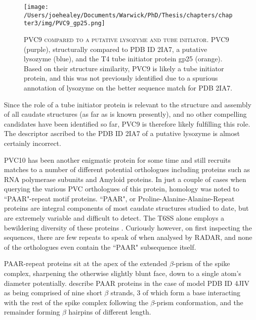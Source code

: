 \begin{figure}[h]
\thispagestyle{IHA-fancy-style}
\centering
\texttt{[image: /Users/joehealey/Documents/Warwick/PhD/Thesis/chapters/chapter3/img/PVC9\_gp25.png]}
\captionsetup{singlelinecheck=off, justification=justified, font=footnotesize, aboveskip=10pt}
\caption[PVC9 as a tube initiator candidate]{\textsc{\normalsize PVC9 compared to a putative lysozyme and tube initiator.}\vspace{0.1cm} \newline PVC9 (purple), structurally compared to PDB ID 2IA7, a putative lysozyme (blue), and the T4 tube initiator protein gp25 (orange). Based on their structure similarity, PVC9 is likely a tube initiator protein, and this was not previously identified due to a spurious annotation of lysozyme on the better sequence match for PDB 2IA7.}
	\label{initiator}
\end{figure}


Since the role of a tube initiator protein is relevant to the structure and assembly of all caudate structures (as far as is known presently), and no other compelling candidates have been identified so far, PVC9 is therefore likely fulfilling this role. The descriptor ascribed to the PDB ID 2IA7 of a putative lysozyme is almost certainly incorrect.

PVC10 has been another enigmatic protein for some time and still recruits matches to a number of different potential orthologues including proteins such as RNA polymerase subunits and Amyloid proteins. In just a couple of cases when querying the various PVC orthologues of this protein, homology was noted to ``PAAR"-repeat motif proteins. ``PAAR", or Proline-Alanine-Alanine-Repeat proteins are integral components of most caudate structures studied to date, but are extremely variable and difficult to detect. The T6SS alone employs a bewildering diversity of these proteins \citep{Shneider2013}. Curiously however, on first inspecting the sequences, there are few repeats to speak of when analysed by RADAR, and none of the orthologues even contain the ``PAAR" subsequence itself.

PAAR-repeat proteins sit at the apex of the extended $\beta$-prism of the spike complex, sharpening the otherwise slightly blunt face, down to a single atom's diameter potentially. \cite{Schneider2013} describe PAAR proteins in the case of model PDB ID 4JIV as being comprised of nine short $\beta$ strands, 3 of which form a base interacting with the rest of the spike complex following the $\beta$-prism conformation, and the remainder forming $\beta$ hairpins of different length.

